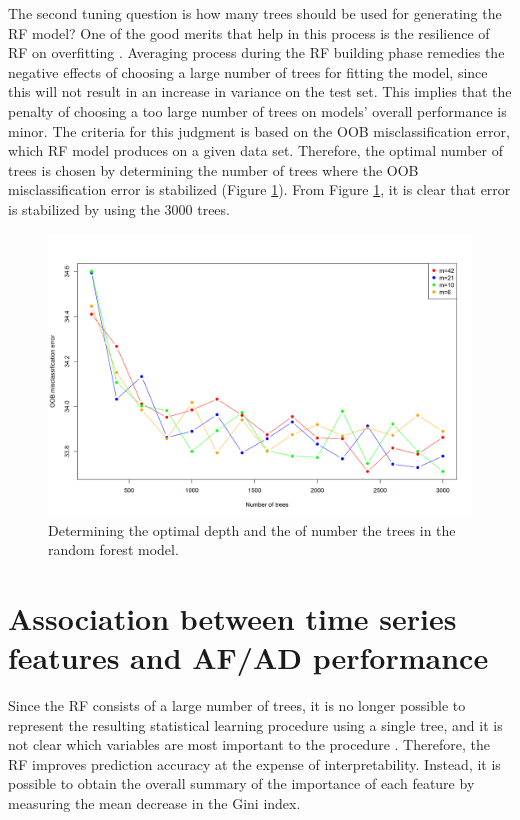 \documentclass[preprint, 3p,
authoryear]{elsarticle} %
\begin{document}
The second tuning question is how many trees should be used for
generating the RF model? One of the good merits that help in this
process is the resilience of RF on overfitting
\citep{friedman2001elements}. Averaging process during the RF building
phase remedies the negative effects of choosing a large number of trees
for fitting the model, since this will not result in an increase in
variance on the test set. This implies that the penalty of choosing a
too large number of trees on models' overall performance is minor. The
criteria for this judgment is based on the OOB misclassification error,
which RF model produces on a given data set. Therefore, the optimal
number of trees is chosen by determining the number of trees where the
OOB misclassification error is stabilized (Figure \ref{fig:tree_depth}).
From Figure \ref{fig:tree_depth}, it is clear that error is stabilized
by using the 3000 trees.

\begin{figure}[H]

{\centering \includegraphics[width=0.9\linewidth]{img/300dpi/Fig_tree_depth_and_ntrees} 

}

\caption{Determining the optimal depth and the of number the trees in the random forest model.}\label{fig:tree_depth}
\end{figure}

\hypertarget{res}{%
\section{Association between time series features and AF/AD
performance}\label{res}}

Since the RF consists of a large number of trees, it is no longer
possible to represent the resulting statistical learning procedure using
a single tree, and it is not clear which variables are most important to
the procedure \citep{james2013introduction}. Therefore, the RF improves
prediction accuracy at the expense of interpretability. Instead, it is
possible to obtain the overall summary of the importance of each feature
by measuring the mean decrease in the Gini index.
\end{document}
